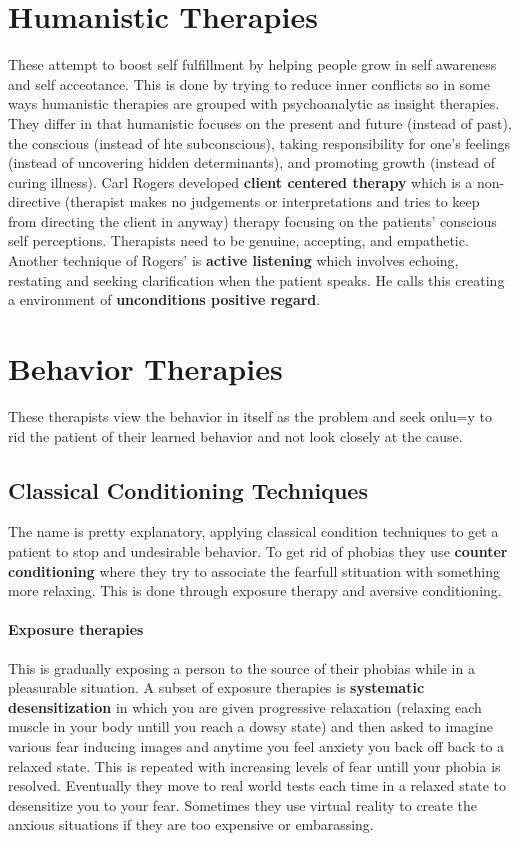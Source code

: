 \documentclass[12pt]{article}
\begin{document}
\section*{Humanistic Therapies}
These attempt to boost self fulfillment by helping people grow in self awareness and self acceotance. This is done by trying to reduce inner conflicts so in some ways humanistic therapies are grouped with psychoanalytic as insight therapies. They differ in that humanistic focuses on the present and future (instead of past), the conscious (instead of hte subconscious), taking responsibility for one’s feelings (instead of uncovering hidden determinants), and promoting growth (instead of curing illness). Carl Rogers developed \textbf{client centered therapy} which is a non-directive (therapist makes no judgements or interpretations and tries to keep from directing the client in anyway) therapy focusing on the patients' conscious self perceptions. Therapists need to be genuine, accepting, and empathetic. Another technique of Rogers' is \textbf{active listening} which involves echoing, restating and seeking clarification when the patient speaks.  He calls this creating a environment of \textbf{unconditions positive regard}. 
\section*{Behavior Therapies}
These therapists view the behavior in itself as the problem and seek onlu=y to rid the patient of their learned behavior and not look closely at the cause.
\subsection*{Classical Conditioning Techniques}
The name is pretty explanatory, applying classical condition techniques to get a patient to stop and undesirable behavior. To get rid of phobias they use \textbf{counter conditioning} where they try to associate the fearfull stituation with something more relaxing. This is done through exposure therapy and aversive conditioning.
\paragraph*{Exposure therapies}
This is gradually exposing a person to the source of their phobias while in a pleasurable situation. A subset of exposure therapies is \textbf{systematic desensitization} in which you are given progressive relaxation (relaxing each muscle in your body untill you reach a dowsy state) and then asked to imagine various fear inducing images and anytime you feel anxiety you back off back to a relaxed state. This is repeated with increasing levels of fear untill your phobia is resolved. Eventually they move to real world tests each time in a relaxed state to desensitize you to your fear. Sometimes they use virtual reality to create the anxious situations if they are too expensive or embarassing. 
\end{document}
